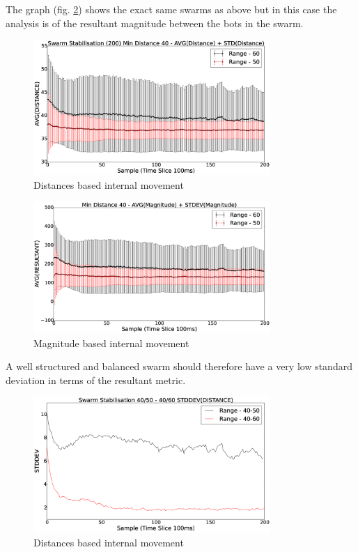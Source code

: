 \documentclass[10pt,journal,letterpaper,twoside]{IEEEtran}
\newcommand{\stability}{internal movement}
\newcommand{\Fig}{fig.}
\begin{document}
The graph (\Fig{} \ref{methods:StabilityMagnitudeSwarm40-5060}) shows the exact same swarms as above but in this case the analysis is of the resultant magnitude between the bots in the swarm.

\begin{figure}[H]
\begin{center}
\includegraphics[width=9cm]{figures/StabilityDistanceSwarm40-5060}
\end{center}
\caption{Distances based \stability{}\label{methods:StabilityDistanceSwarm40-5060}}
\end{figure}

\begin{figure}[H]
\begin{center}
\includegraphics[width=9cm]{figures/StabilityMagnitudeSwarm40-5060}
\end{center}
\caption{Magnitude based \stability{}\label{methods:StabilityMagnitudeSwarm40-5060}}
\end{figure}

A well structured and balanced swarm should therefore have a very low standard deviation in terms of the resultant metric.

\begin{figure}[H]
\begin{center}
\includegraphics[width=9cm]{figures/StabilityDistanceSwarm}
\end{center}
\caption{Distances based \stability{}\label{methods:StabilityDistanceSwarm}}
\end{figure}
\end{document}
